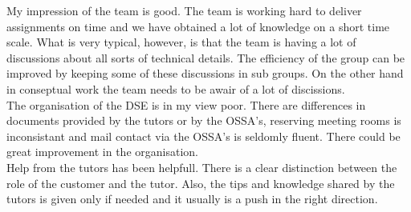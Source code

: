 My impression of the team is good. The team is working hard to deliver assignments on time and we have obtained a lot of knowledge on a short time scale. What is very typical, however, is that the team is having a lot of discussions about all sorts of technical details. The efficiency of the group can be improved by keeping some of these discussions in sub groups. On the other hand in conseptual work the team needs to be awair of a lot of discissions.\\
The organisation of the DSE is in my view poor. There are differences in documents provided by the tutors or by the OSSA's, reserving meeting rooms is inconsistant and mail contact via the OSSA's is seldomly fluent. There could be great improvement in the organisation.\\
Help from the tutors has been helpfull. There is a clear distinction between the role of the customer and the tutor. Also, the tips and knowledge shared by the tutors is given only if needed and it usually is a push in the right direction.\\